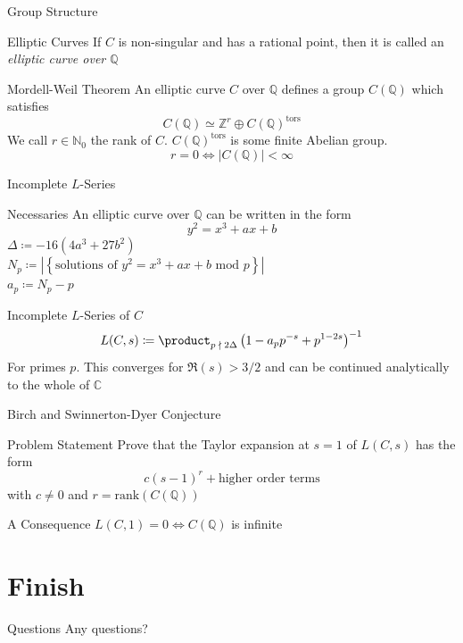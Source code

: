 \documentclass{beamer}
\newcommand{\Complex}{\mathbb{C}}
\newcommand{\Rpart}[1]{\mathfrak{R}\left(#1\right)}
\newcommand{\Rational}{\mathbb{Q}}
\newcommand{\Integer}{\mathbb{Z}}
\newcommand{\Natural}{\mathbb{N}}
\begin{document}
  \begin{frame}{Group Structure}
      \pause
      \begin{block}{Elliptic Curves}
          If $C$ is non-singular and has a rational point, then it is called an
          \textit{elliptic curve over $\Rational$}
      \end{block}
      \pause
      \begin{block}{Mordell-Weil Theorem}
          An elliptic curve $C$ over $\Rational$ defines a group $C(\Rational)$
          which satisfies 
          $$C(\Rational) \simeq \Integer^r
          \oplus C(\Rational)^{\mathrm{tors}}$$
          \pause
          We call $r \in \Natural_0$ the rank of $C$.
          $C(\Rational)^{\mathrm{tors}}$ is some finite Abelian group. \pause
          \\
          $$r = 0 \iff \left|C(\Rational)\right| < \infty$$
      \end{block}
  \end{frame}
  \begin{frame}{Incomplete $L$-Series}
      \pause
      \begin{block}{Necessaries}
          An elliptic curve over $\Rational$ can be written in the form
          $$y^2 = x^3 + ax + b$$
          \pause
          $\Delta \coloneqq -16(4a^3 + 27b^2)$ \pause \\
          $N_p \coloneqq \left|\left\{\text{solutions of } y^2 = x^3 + ax + b
          \text{ mod } p\right\}\right|$ \pause \\
          $a_p \coloneqq N_p - p$
      \end{block}
      \pause
      \begin{block}{Incomplete $L$-Series of $C$}
          $$L(C, s) \coloneqq \product_{p\; \nmid\; 2 \Delta} \left(1 -
              a_p p^{-s} + p^{1 - 2s}\right)^{-1}$$
          For primes $p$. This converges for $\Rpart{s} > 3/2$ and can be
          continued analytically to the whole of $\Complex$ 
      \end{block}
  \end{frame}
  \begin{frame}{Birch and Swinnerton-Dyer Conjecture}
      \pause
      \begin{block}{Problem Statement}
          Prove that the Taylor expansion at $s=1$ of $L(C, s)$ has the form
          $$c(s-1)^r + \text{higher order terms}$$ with $c \ne 0$ and $r =
          \mathrm{rank}(C(\Rational))$
      \end{block}
      \pause
      \begin{block}{A Consequence}
          $L(C, 1) = 0 \iff C(\Rational)$ is infinite
      \end{block}
  \end{frame}
  \section{Finish}
  \begin{frame}{Questions}
      Any questions?
  \end{frame}
\end{document}
